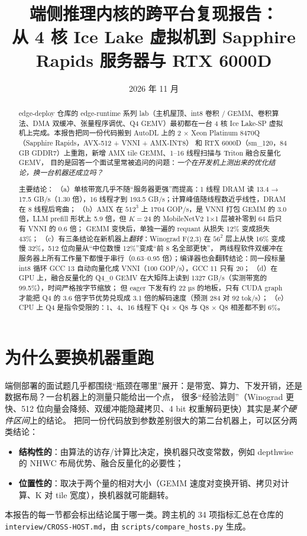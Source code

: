 \documentclass[11pt,a4paper]{ctexart}
\title{端侧推理内核的跨平台复现报告：\\从 4 核 Ice Lake 虚拟机到 Sapphire Rapids 服务器与 RTX 6000D}
\author{\authorline}
\date{2026 年 11 月}
\begin{document}
\maketitle

\begin{abstract}
edge-deploy 仓库的 edge-runtime 系列 lab（主机屋顶、int8 卷积 / GEMM、卷积算法、DMA 双缓冲、张量程序调优、Q4 GEMV）最初都在一台
4 核 Ice Lake-SP 虚拟机上完成。本报告把同一份代码搬到 AutoDL 上的 2 × Xeon Platinum 8470Q（Sapphire Rapids，AVX-512 + VNNI + AMX-INT8）
和 RTX 6000D（sm\_120，84 GB GDDR7）上重跑，新增 AMX tile GEMM、1--16 线程扫描与 Triton 融合反量化 GEMV，
目的是回答一个面试里常被追问的问题：\emph{一个在开发机上测出来的优化结论，换一台机器还成立吗？}

主要结论：
（a）单核带宽几乎不随“服务器更强”而提高：1 线程 DRAM 读 13.4 → 17.5 GB/s（1.30 倍），16 线程才到 193.5 GB/s；计算峰值随线程数近乎线性，DRAM 在 8 线程后弯曲；
（b）AMX 在 $512^3$ 上 1704 GOP/s，是 VNNI 打包 GEMM 的 3.0 倍，LLM prefill 形状上 5.9 倍，但 $K{=}24$ 的 MobileNetV2 1×1 层被补零到 64 后只有 VNNI 的 0.6 倍；
GEMM 变快后，单独一遍的 requant 从损失 12\% 变成损失 43\%；
（c）有三条结论在新机器上\emph{翻转}：Winograd F(2,3) 在 $56^2$ 层上从快 16\% 变成慢 32\%，512 位向量从“中位数慢 12\%”变成“前 8 名全部更快”，
两线程软件双缓冲在服务器上所有工作量下都慢于串行（0.63--0.95 倍）；编译器也会翻转结论：同一段标量 int8 循环 GCC 13 自动向量化成 VNNI（100 GOP/s），GCC 11 只有 20；
（d）在 GPU 上，融合反量化的 Q4\_0 GEMV 在大矩阵上读到 1327 GB/s（实测带宽的 99.5\%），时间严格按字节缩放；
但 eager 下发有约 22 µs 的地板，只有 CUDA graph 才能把 Q4 的 3.6 倍字节优势兑现成 3.1 倍的解码速度（预测 284 对 92 tok/s）；
（e）CPU 上 Q4 是指令受限的：1、4、16 线程下 Q4 × Q8 与 Q8 × Q8 相差都不到 6\%。
\end{abstract}

\tableofcontents
\newpage

\section{为什么要换机器重跑}

端侧部署的面试题几乎都围绕“瓶颈在哪里”展开：是带宽、算力、下发开销，还是数据布局？一台机器上的测量只能给出一个点，
很多“经验法则”（Winograd 更快、512 位向量会降频、双缓冲能隐藏拷贝、4 bit 权重解码更快）其实是\emph{某个硬件区间}上的结论。
把同一份代码放到参数差别很大的第二台机器上，可以区分两类结论：
\begin{itemize}
  \item \textbf{结构性的}：由算法的访存/计算比决定，换机器只改变常数，例如 depthwise 的 NHWC 布局优势、融合反量化的必要性；
  \item \textbf{位置性的}：取决于两个量的相对大小（GEMM 速度对变换开销、拷贝对计算、K 对 tile 宽度），换机器就可能翻转。
\end{itemize}
本报告的每一节都会标出结论属于哪一类。跨主机的 34 项指标汇总在仓库的 \nolinkurl{interview/CROSS-HOST.md}，由 \nolinkurl{scripts/compare_hosts.py} 生成。
\end{document}
